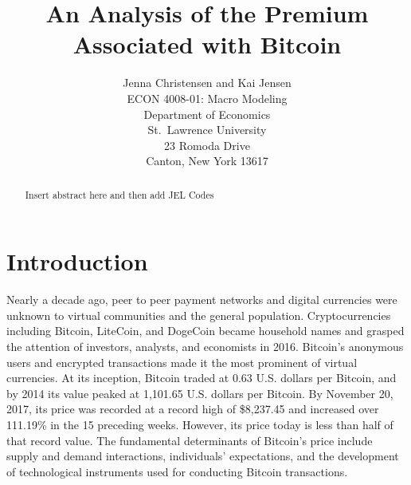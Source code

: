 \documentclass[]{article}
\title{An Analysis of the Premium Associated with Bitcoin}
\author{Jenna Christensen and Kai Jensen\\
ECON 4008-01: Macro Modeling\\
Department of Economics\\
St.~Lawrence University\\
23 Romoda Drive\\
Canton, New York 13617}
\date{}
\begin{document}
\maketitle
\begin{abstract}
Insert abstract here and then add JEL Codes \par
\end{abstract}

\section{Introduction}\label{introduction}

Nearly a decade ago, peer to peer payment networks and digital
currencies were unknown to virtual communities and the general
population. Cryptocurrencies including Bitcoin, LiteCoin, and DogeCoin
became household names and grasped the attention of investors, analysts,
and economists in 2016. Bitcoin's anonymous users and encrypted
transactions made it the most prominent of virtual currencies. At its
inception, Bitcoin traded at 0.63 U.S. dollars per Bitcoin, and by 2014
its value peaked at 1,101.65 U.S. dollars per Bitcoin. By November 20,
2017, its price was recorded at a record high of \$8,237.45 and
increased over 111.19\% in the 15 preceding weeks. However, its price
today is less than half of that record value. The fundamental
determinants of Bitcoin's price include supply and demand interactions,
individuals' expectations, and the development of technological
instruments used for conducting Bitcoin transactions.
\end{document}
